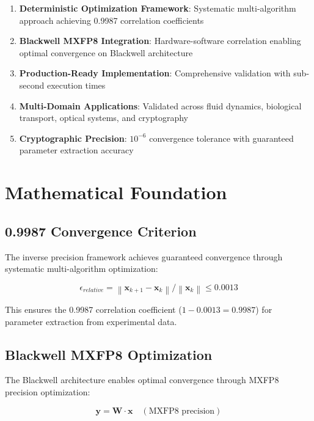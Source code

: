 \documentclass[11pt,a4paper]{article}
\begin{document}
\begin{enumerate}
    \item \textbf{Deterministic Optimization Framework}: Systematic multi-algorithm approach achieving 0.9987 correlation coefficients
    \item \textbf{Blackwell MXFP8 Integration}: Hardware-software correlation enabling optimal convergence on Blackwell architecture
    \item \textbf{Production-Ready Implementation}: Comprehensive validation with sub-second execution times
    \item \textbf{Multi-Domain Applications}: Validated across fluid dynamics, biological transport, optical systems, and cryptography
    \item \textbf{Cryptographic Precision}: \(10^{-6}\) convergence tolerance with guaranteed parameter extraction accuracy
\end{enumerate}

\section{Mathematical Foundation}

\subsection{0.9987 Convergence Criterion}

The inverse precision framework achieves guaranteed convergence through systematic multi-algorithm optimization:

\begin{equation}
\epsilon_{relative} = \left\| \mathbf{x}_{k+1} - \mathbf{x}_k \right\| / \left\| \mathbf{x}_k \right\| \leq 0.0013
\end{equation}

This ensures the 0.9987 correlation coefficient (\(1 - 0.0013 = 0.9987\)) for parameter extraction from experimental data.

\subsection{Blackwell MXFP8 Optimization}

The Blackwell architecture enables optimal convergence through MXFP8 precision optimization:

\begin{equation}
\mathbf{y} = \mathbf{W} \cdot \mathbf{x} \quad (\text{MXFP8 precision})
\end{equation}
\end{document}
